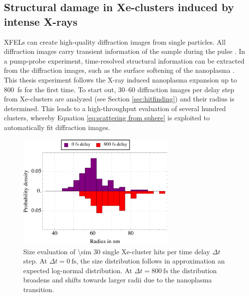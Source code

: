 \subsection{Structural damage in Xe-clusters induced by intense X-rays}\label{sec:xenon-data}
XFELs can create high-quality diffraction images from single particles. All diffraction images carry transient information of the sample during the pulse \cite{Bostedt-2012-PRL}. In a pump-probe experiment, time-resolved structural information can be extracted from the diffraction images, such as the surface softening of the nanoplasma \cite{Gorkhover-2016-NatPho}. This thesis experiment follows the X-ray induced nanoplasma expansion up to \SI{800}{\femto\second} for the first time.
To start out, \numrange{30}{60} diffraction images per delay step from Xe-clusters are analyzed (see Section \ref{sec:hitfinding}) and their radius is determined. This leads to a high-throughput evaluation of several hundred clusters, whereby Equation \eqref{eq:scattering from sphere} is exploited to automatically fit diffraction images.\\[1\baselineskip]
\begin{figure}
	\centering
		\includegraphics[width=0.70\textwidth]{images/results/size-distributions.png}
	\caption[Single Xe-cluster size distribution at varying time delay $\Delta t$.]{Size evaluation of \num{\sim 30} single Xe-cluster hits per time delay $\Delta t$ step. At $\Delta t=\SI{0}{\femto\second}$, the size distribution follows in approximation an expected log-normal distribution. At $\Delta t=\SI{800}{\femto\second}$ the distribution broadens and shifts towards larger radii due to the nanoplasma transition.}
	\label{fig:size-distributions}
\end{figure}
